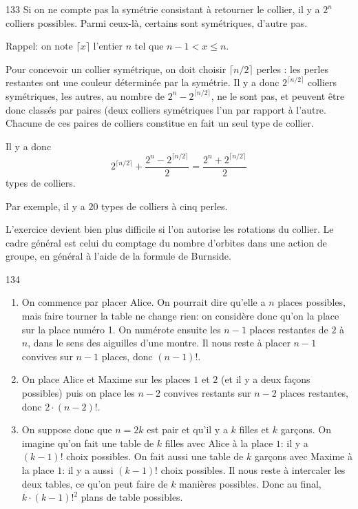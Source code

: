 \begin{Soln}{133}
Si on ne compte pas la symétrie consistant à retourner le collier, il y a $2^n$ colliers possibles. Parmi ceux-là, certains sont symétriques, d'autre pas.

Rappel: on note $\lceil x \rceil$ l'entier $n$ tel que $n-1<x \le n$.

Pour concevoir un collier symétrique, on doit choisir $\lceil n/2 \rceil$ perles : les perles restantes ont une couleur déterminée par la symétrie. Il y a donc $2^{\lceil n/2 \rceil}$ colliers symétriques, les autres, au nombre de $2^n - 2^{\lceil n/2 \rceil}$, ne le sont pas, et peuvent être donc classés par paires (deux colliers symétriques l'un par rapport à l'autre. Chacune de ces paires de colliers constitue en fait un seul \og type\fg{} de collier.

Il y a donc
\[ 2^{\lceil n/2 \rceil} + \frac{2^n-2^{\lceil n/2 \rceil}}{2} = \frac{2^n+2^{\lceil n/2 \rceil}}{2}\]
types de colliers.

Par exemple, il y a $20$ types de colliers à cinq perles.

L'exercice devient bien plus difficile si l'on autorise les rotations du collier. Le cadre général est celui du comptage du nombre d'orbites dans une action de groupe, en général à l'aide de la formule de Burnside.
\end{Soln}
\begin{Soln}{134}
\begin{enumerate}
\item On commence par placer Alice. On pourrait dire qu'elle a $n$ places possibles, mais faire tourner la table ne change rien: on considère donc qu'on la place sur la place numéro 1. On numérote ensuite les $n-1$ places restantes de $2$ à $n$, dans le sens des aiguilles d'une montre. Il nous reste à placer $n-1$ convives sur $n-1$ places, donc $(n-1)!$.
\item On place Alice et Maxime sur les places $1$ et $2$ (et il y a deux façons possibles) puis on place les $n-2$ convives restants sur $n-2$ places restantes, donc $2 \cdot (n-2)!$.
\item On suppose donc que $n=2k$ est pair et qu'il y a $k$ filles et $k$ garçons. On imagine qu'on fait une table de $k$ filles avec Alice à la place $1$: il y a $(k-1)!$ choix possibles. On fait aussi une table de $k$ garçons avec Maxime à la place $1$: il y a aussi $(k-1)!$ choix possibles. Il nous reste à intercaler les deux tables, ce qu'on peut faire de $k$ manières possibles. Donc au final, $k\cdot (k-1)!^2$ plans de table possibles.
\end{enumerate}
\end{Soln}

